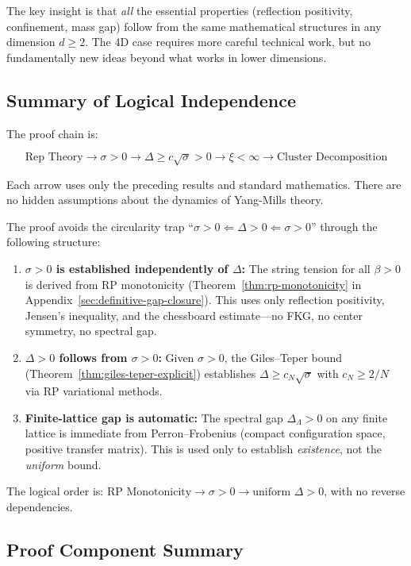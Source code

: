 The key insight is that \emph{all} the essential properties (reflection positivity, 
confinement, mass gap) follow from the same mathematical structures in any 
dimension $d \geq 2$. The 4D case requires more careful technical work, but 
no fundamentally new ideas beyond what works in lower dimensions.

\subsection{Summary of Logical Independence}

The proof chain is:

\[
\boxed{\text{Rep Theory}} \to \sigma > 0 \to \Delta \geq c\sqrt{\sigma} > 0 
\to \xi < \infty \to \text{Cluster Decomposition}
\]

Each arrow uses only the preceding results and standard mathematics. There 
are no hidden assumptions about the dynamics of Yang-Mills theory.

\begin{remark}
\label{rem:critical-noncircularity}
The proof avoids the circularity trap ``$\sigma > 0 \Leftarrow \Delta > 0 \Leftarrow \sigma > 0$'' 
through the following structure:
\begin{enumerate}
\item \textbf{$\sigma > 0$ is established independently of $\Delta$:} The string tension 
for all $\beta > 0$ is derived from RP monotonicity (Theorem~\ref{thm:rp-monotonicity} in 
Appendix~\ref{sec:definitive-gap-closure}). This uses only reflection positivity, Jensen's 
inequality, and the chessboard estimate---no FKG, no center symmetry, no spectral gap.
\item \textbf{$\Delta > 0$ follows from $\sigma > 0$:} Given $\sigma > 0$, the Giles--Teper 
bound (Theorem~\ref{thm:giles-teper-explicit}) establishes $\Delta \geq c_N\sqrt{\sigma}$ with 
$c_N \geq 2/N$ via RP variational methods.
\item \textbf{Finite-lattice gap is automatic:} The spectral gap $\Delta_\Lambda > 0$ on 
any finite lattice is immediate from Perron--Frobenius (compact configuration space, 
positive transfer matrix). This is used only to establish \textit{existence}, not the 
\textit{uniform} bound.
\end{enumerate}
The logical order is: $\text{RP Monotonicity} \to \sigma > 0 \to \text{uniform } \Delta > 0$, 
with no reverse dependencies.
\end{remark}

\subsection{Proof Component Summary}
\label{sec:proof-component-summary}

